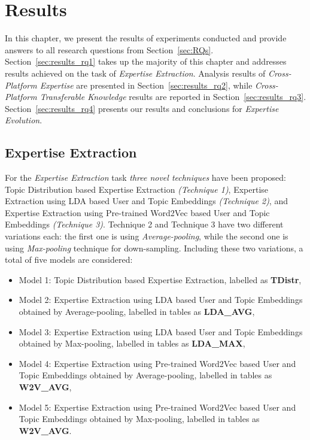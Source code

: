\chapter{Results\label{chap:result}}

    In this chapter, we present the results of experiments conducted and provide answers to all research questions from Section~\ref{sec:RQs}. Section~\ref{sec:results_rq1} takes up the majority of this chapter and addresses results achieved on the task of \emph{Expertise Extraction}. Analysis results of \emph{Cross-Platform Expertise} are presented in Section~\ref{sec:results_rq2}, while \emph{Cross-Platform Transferable Knowledge} results are reported in Section~\ref{sec:results_rq3}.  Section~\ref{sec:results_rq4} presents our results and conclusions for \emph{Expertise Evolution}.

    \section{Expertise Extraction\label{sec:results_rq1}}
        
        For the \emph{Expertise Extraction} task \emph{three novel techniques} have been proposed: Topic Distribution based Expertise Extraction \emph{(Technique 1)}, Expertise Extraction using LDA based User and Topic Embeddings \emph{(Technique 2)}, and Expertise Extraction using Pre-trained Word2Vec based User and Topic Embeddings \emph{(Technique 3)}. Technique 2 and Technique 3 have two different variations each: the first one is using \emph{Average-pooling}, while the second one is using \emph{Max-pooling} technique for down-sampling. Including these two variations, a total of five models are considered:
        
        \begin{itemize}
            \item Model 1: Topic Distribution based Expertise Extraction, labelled as \textbf{TDistr},
            \item Model 2: Expertise Extraction using LDA based User and Topic Embeddings obtained by Average-pooling, labelled in tables as \textbf{LDA\_AVG},
            \item Model 3: Expertise Extraction using LDA based User and Topic Embeddings obtained by Max-pooling, labelled in tables as \textbf{LDA\_MAX},
            \item Model 4: Expertise Extraction using Pre-trained Word2Vec based User and Topic Embeddings obtained by Average-pooling, labelled in tables as \textbf{W2V\_AVG},
            \item Model 5: Expertise Extraction using Pre-trained Word2Vec based User and Topic Embeddings obtained by Max-pooling, labelled in tables as \textbf{W2V\_AVG}.
        \end{itemize}
        
